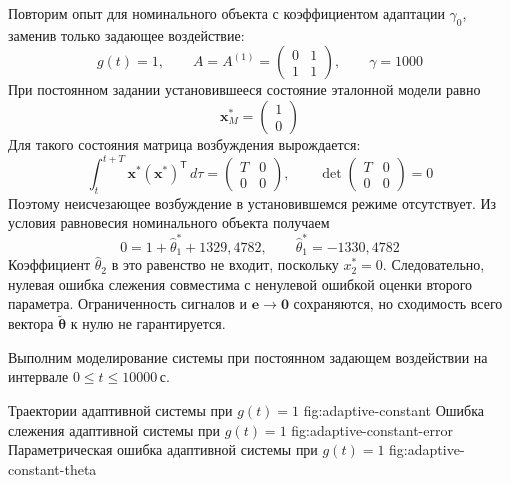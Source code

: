 Повторим опыт для номинального объекта с коэффициентом адаптации
$\gamma_0$, заменив только задающее воздействие:
\begin{equation}
  g(t)=1,
  \qquad A=A^{(1)}=\begin{pmatrix}0&1\\1&1\end{pmatrix},
  \qquad \gamma=1000
\end{equation}
При постоянном задании установившееся состояние эталонной модели равно
\begin{equation}
  \bm x_M^*=\begin{pmatrix}1\\0\end{pmatrix}
\end{equation}
Для такого состояния матрица возбуждения вырождается:
\begin{equation}
  \int_t^{t+T}\bm x^*(\bm x^*)^{\mathsf T}\,d\tau
  =\begin{pmatrix}T&0\\0&0\end{pmatrix},
  \qquad \det\begin{pmatrix}T&0\\0&0\end{pmatrix}=0
\end{equation}
Поэтому неисчезающее возбуждение в установившемся режиме отсутствует.
Из условия равновесия номинального объекта получаем
\begin{equation}
  0=1+\hat\theta_1^*+1329{,}4782,
  \qquad \hat\theta_1^*=-1330{,}4782
\end{equation}
Коэффициент $\hat\theta_2$ в это равенство не входит, поскольку $x_2^*=0$.
Следовательно, нулевая ошибка слежения совместима с ненулевой
ошибкой оценки второго параметра. Ограниченность сигналов и
$\bm e\to\bm 0$ сохраняются, но сходимость всего вектора
$\tilde{\bm\theta}$ к нулю не гарантируется.

Выполним моделирование системы при постоянном задающем воздействии
на интервале $0\le t\le10000\,\text{с}$.

  {Траектории адаптивной системы при $g(t)=1$}
  {fig:adaptive-constant}
  {Ошибка слежения адаптивной системы при $g(t)=1$}
  {fig:adaptive-constant-error}
  {Параметрическая ошибка адаптивной системы при $g(t)=1$}
  {fig:adaptive-constant-theta}

